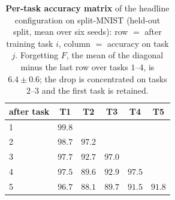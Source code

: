 \documentclass{article}
\begin{document}
\begin{table}[H]
\centering\small
\caption{\textbf{Per-task accuracy matrix} of the headline configuration on split-MNIST
(held-out split, mean over six seeds): row $=$ after training task $i$, column $=$ accuracy on
task $j$. Forgetting $F$, the mean of the diagonal minus the last row over tasks $1$--$4$, is
$6.4\pm0.6$; the drop is concentrated on tasks $2$--$3$ and the first task is retained.}
\label{tab:accmatrix}
\begin{tabular}{lccccc}
\toprule
after task & T1 & T2 & T3 & T4 & T5 \\
\midrule
1 & $99.8$ & & & & \\
2 & $98.7$ & $97.2$ & & & \\
3 & $97.7$ & $92.7$ & $97.0$ & & \\
4 & $97.5$ & $89.6$ & $92.9$ & $97.5$ & \\
5 & $96.7$ & $88.1$ & $89.7$ & $91.5$ & $91.8$ \\
\bottomrule
\end{tabular}
\end{table}
\end{document}

